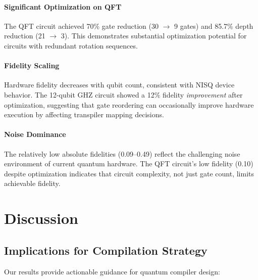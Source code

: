 \documentclass[twocolumn,showpacs,preprintnumbers,amsmath,amssymb,prb]{revtex4-2}
\begin{document}
\paragraph{Significant Optimization on QFT} The QFT circuit achieved 70\% gate reduction (30 $\rightarrow$ 9 gates) and 85.7\% depth reduction (21 $\rightarrow$ 3). This demonstrates substantial optimization potential for circuits with redundant rotation sequences.

\paragraph{Fidelity Scaling} Hardware fidelity decreases with qubit count, consistent with NISQ device behavior. The 12-qubit GHZ circuit showed a 12\% fidelity \textit{improvement} after optimization, suggesting that gate reordering can occasionally improve hardware execution by affecting transpiler mapping decisions.

\paragraph{Noise Dominance} The relatively low absolute fidelities (0.09--0.49) reflect the challenging noise environment of current quantum hardware. The QFT circuit's low fidelity (0.10) despite optimization indicates that circuit complexity, not just gate count, limits achievable fidelity.

\section{Discussion}
\label{sec:discussion}

\subsection{Implications for Compilation Strategy}

Our results provide actionable guidance for quantum compiler design:
\end{document}

